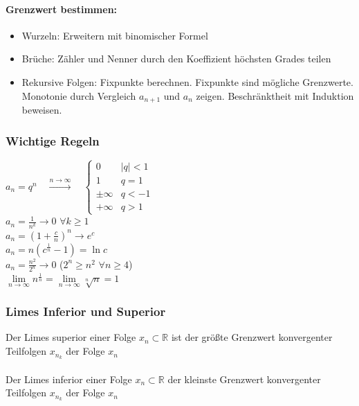 \documentclass[6pt,a4paper]{scrartcl}
\newcommand{\ra}[0]{\ensuremath{\rightarrow}}
\begin{document}
\begin{multicols*}{4}
\paragraph{Grenzwert bestimmen:}
\begin{itemize}\itemsep0pt
\item Wurzeln: Erweitern mit binomischer Formel
\item Brüche: Zähler und Nenner durch den Koeffizient höchsten Grades teilen
\item Rekursive Folgen: Fixpunkte berechnen. Fixpunkte sind mögliche Grenzwerte. Monotonie durch Vergleich $a_{n+1}$ und $a_n$ zeigen. Beschränktheit mit Induktion beweisen.
\end{itemize}

\subsubsection{Wichtige Regeln}
$a_n=q^n \quad \overset{n \rightarrow \infty}{\longrightarrow} \quad \begin{cases} 0 & |q|<1 \\ 1 & q=1 \\ \pm \infty & q < -1  \\  + \infty & q > 1\end{cases}$ \\
$a_n=\frac{1}{n^k}\rightarrow 0$ \qquad $\forall k \ge 1$\\ 
$a_n=\left(1+\frac{c}{n}\right)^n \rightarrow e^c$ \\
$a_n=n\left(c^{\frac1{n}}-1\right) = \ln c$\\
$a_n=\frac{n^2}{2^n}\ra 0$ \qquad \qquad \qquad ($2^n \ge n^2$ \quad $\forall n\ge 4$) \\
$\lim\limits_{n\to\infty}n^{\frac{1}{n}}=\lim\limits_{n\to\infty}\sqrt[n]{n}=1$


\subsubsection{Limes Inferior und Superior}
Der Limes superior einer Folge $x_n \subset \mathbb{R}$ ist der größte Grenzwert konvergenter Teilfolgen $x_{n_k}$ der Folge ${x_n}$ \\ \\
Der Limes inferior einer Folge $x_n \subset \mathbb{R}$ der kleinste Grenzwert konvergenter Teilfolgen $x_{n_k}$ der Folge $x_n$



\end{multicols*}
\end{document}
